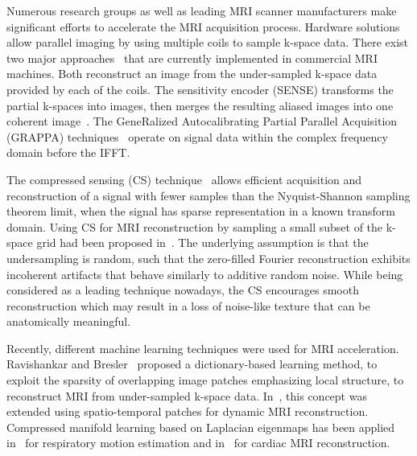 \documentclass[10pt,journal,compsoc]{IEEEtran}
\begin{document}
Numerous research groups as well as leading MRI scanner manufacturers make significant efforts to accelerate the MRI acquisition process. Hardware solutions allow parallel imaging by using multiple coils \cite{roemer1990nmr} to sample k-space data. There exist two major approaches~\cite{Deshmane2012} that are currently implemented in commercial MRI machines. Both reconstruct an image from the under-sampled k-space data provided by each of the coils. The sensitivity encoder (SENSE) transforms the partial k-spaces into images, then merges the resulting aliased images into one coherent image~\cite{pruessmann1999sense}. 
The GeneRalized Autocalibrating Partial Parallel Acquisition (GRAPPA) techniques~\cite{griswold2002generalized} operate on signal data within the complex frequency domain before the IFFT.

The compressed sensing (CS) technique~\cite{donoho2006compressed} allows efficient acquisition and reconstruction of a signal with fewer samples than the Nyquist-Shannon sampling theorem limit, when the signal has sparse representation in a known transform domain. Using CS for MRI reconstruction by sampling a small subset of the k-space grid had been proposed in~\cite{lustig2007sparse}. The underlying assumption is that the undersampling is random, such that the zero-filled Fourier reconstruction exhibits incoherent artifacts that behave similarly to additive random noise.
While being considered as a leading technique nowadays, the CS encourages smooth reconstruction which may result in a loss of noise-like texture that can be anatomically meaningful.
 
Recently, different machine learning techniques were used for MRI acceleration. 
Ravishankar and Bresler~\cite{ravishankar2011mr} proposed a dictionary-based learning method, to exploit the sparsity of overlapping image patches emphasizing local structure, to reconstruct MRI from under-sampled k-space data. In~\cite{caballero2014dictionary}, this concept was extended using spatio-temporal patches for dynamic MRI reconstruction.
Compressed manifold learning based on Laplacian eigenmaps has been applied in~\cite{usman2014compressive} for respiratory motion estimation and in~\cite{bhatia2015fast} for cardiac MRI reconstruction.
\end{document}
